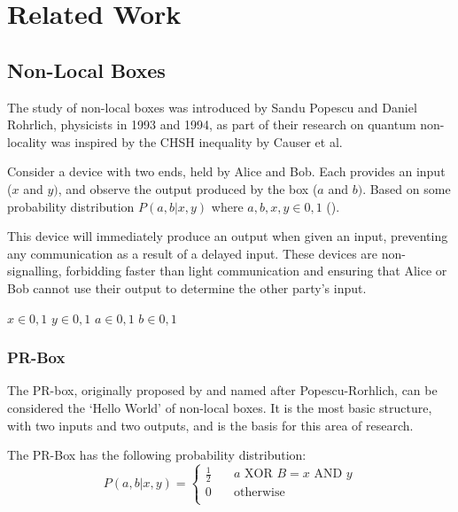 \documentclass[report.tex]{subfiles}
\begin{document}
\chapter{Related Work} %
\label{cha:related_work}


\section{Non-Local Boxes} %
\label{sec:non_local_boxes}
The study of non-local boxes was introduced by Sandu Popescu and Daniel
Rohrlich, physicists in 1993 and 1994, as part of their research on quantum
non-locality was inspired by the CHSH inequality by Causer et al.


Consider a device with two ends, held by Alice and Bob. Each provides an
input (\(x\) and \(y)\), and observe the output produced by the box (\(a\) and
\(b)\). Based on some probability distribution \(P(a,b | x,y)\) where \(a, b, x,
y \in {0, 1}\) (\cite[Definition~1]{nlb_lamontagne}). 

This device will immediately produce an output when given an input, preventing
any communication as a result of a delayed input. These devices are
non-signalling, forbidding faster than light communication and ensuring that
Alice or Bob cannot use their output to determine the other party's input.

\(x \in {0, 1}\) \(y \in {0, 1}\)
\(a \in {0, 1}\) \(b \in {0, 1}\)


\subsection{PR-Box} %
\label{sub:pr_box}
The PR-box, originally proposed by and named after Popescu-Rorhlich, can be
considered the `Hello World' of non-local boxes. It is the most basic structure,
with two inputs and two outputs, and is the basis for this area of research.

The PR-Box has the following probability distribution:
\[
    P(a, b | x, y) = 
    \begin{cases}
        \frac{1}{2} & \quad a \text{ XOR } B = x \text{ AND } y \\
        0 & \quad \text{otherwise} \\
    \end{cases}
\]
\end{document}
